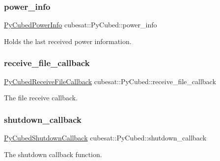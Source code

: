 \subsubsection{\texorpdfstring{power\+\_\+info}{power\_info}}
{\footnotesize\ttfamily \hyperlink{structcubesat_1_1PyCubedPowerInfo}{Py\+Cubed\+Power\+Info} cubesat\+::\+Py\+Cubed\+::power\+\_\+info\hspace{0.3cm}{\ttfamily [private]}}



Holds the last received power information. 

\mbox{\label{classcubesat_1_1PyCubed_a7becf9e9df5a296a53f7f4228c28451a}} 
\subsubsection{\texorpdfstring{receive\+\_\+file\+\_\+callback}{receive\_file\_callback}}
{\footnotesize\ttfamily \hyperlink{namespacecubesat_a378b098737c521b2e13df70ad8ddc0ba}{Py\+Cubed\+Receive\+File\+Callback} cubesat\+::\+Py\+Cubed\+::receive\+\_\+file\+\_\+callback\hspace{0.3cm}{\ttfamily [private]}}



The file receive callback. 

\mbox{\label{classcubesat_1_1PyCubed_abcdb5ea9c3b544a261a3aa2ec395836f}} 
\subsubsection{\texorpdfstring{shutdown\+\_\+callback}{shutdown\_callback}}
{\footnotesize\ttfamily \hyperlink{namespacecubesat_abcc8eedef699fb7e3f433200cc25e181}{Py\+Cubed\+Shutdown\+Callback} cubesat\+::\+Py\+Cubed\+::shutdown\+\_\+callback\hspace{0.3cm}{\ttfamily [private]}}



The shutdown callback function. 

